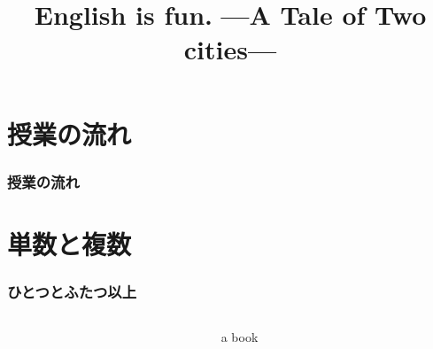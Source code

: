 \documentclass[aspectratio=169]{beamer}
\title{English is fun.\,\,{}---A Tale of Two cities---}
\author{}
\institute[]{}
\date[]
\begin{document}
\begin{frame}[plain]
  \titlepage
\end{frame}

\section*{授業の流れ}
\begin{frame}[plain]
  \frametitle{授業の流れ}
  \tableofcontents
\end{frame}

\section{単数と複数}

\begin{frame}[plain]\frametitle{ひとつとふたつ以上}
\begin{columns}
\begin{column}{.2\textwidth}
\end{column}\pause
\begin{column}{.75\textwidth}\LARGE
a book
\end{column}
\end{columns}


\end{frame}
\end{document}
